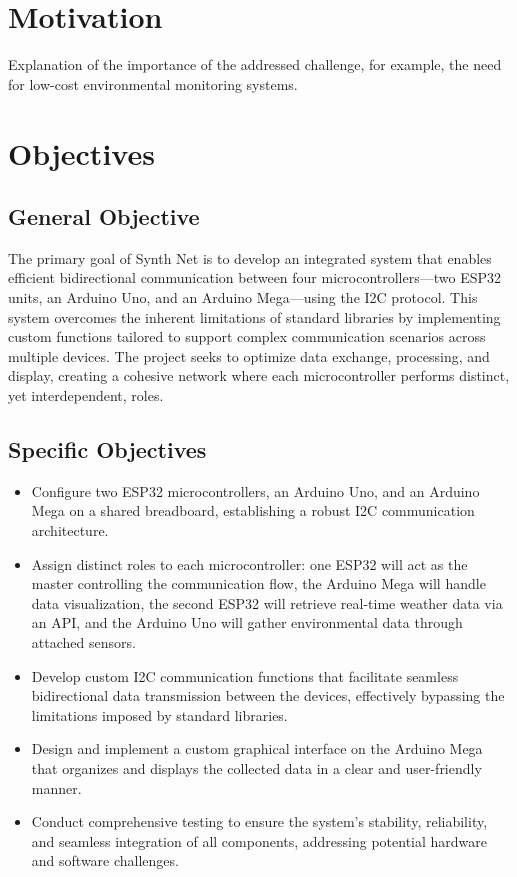 \documentclass[a4paper,12pt]{report}
\begin{document}
\section{Motivation}
Explanation of the importance of the addressed challenge, for example, the need for low-cost environmental monitoring systems.

\section{Objectives}
\subsection{General Objective}
The primary goal of Synth Net is to develop an integrated system that enables efficient bidirectional communication between four microcontrollers—two ESP32 units, an Arduino Uno, and an Arduino Mega—using the I2C protocol. This system overcomes the inherent limitations of standard libraries by implementing custom functions tailored to support complex communication scenarios across multiple devices. The project seeks to optimize data exchange, processing, and display, creating a cohesive network where each microcontroller performs distinct, yet interdependent, roles.

\subsection{Specific Objectives}
\begin{itemize}
    \item Configure two ESP32 microcontrollers, an Arduino Uno, and an Arduino Mega on a shared breadboard, establishing a robust I2C communication architecture.
    \item Assign distinct roles to each microcontroller: one ESP32 will act as the master controlling the communication flow, the Arduino Mega will handle data visualization, the second ESP32 will retrieve real-time weather data via an API, and the Arduino Uno will gather environmental data through attached sensors.
    \item Develop custom I2C communication functions that facilitate seamless bidirectional data transmission between the devices, effectively bypassing the limitations imposed by standard libraries.
    \item Design and implement a custom graphical interface on the Arduino Mega that organizes and displays the collected data in a clear and user-friendly manner.
    \item Conduct comprehensive testing to ensure the system’s stability, reliability, and seamless integration of all components, addressing potential hardware and software challenges.
\end{itemize}
\end{document}

